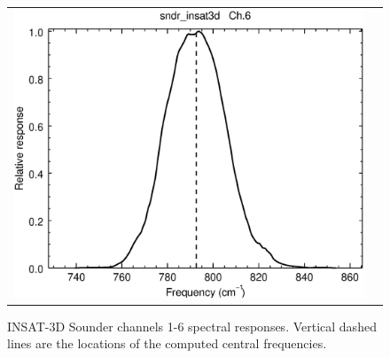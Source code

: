 \begin{figure}[H]
\begin{tabular}{c c}
    \includegraphics[scale=0.35]{graphics/sndr/srf/sndr_insat3d-6.eps}
  \end{tabular}
  \caption{INSAT-3D Sounder channels 1-6 spectral responses. Vertical dashed lines are the locations of the computed central frequencies.}
  \label{fig:sndr_ch1-6}
\end{figure}


